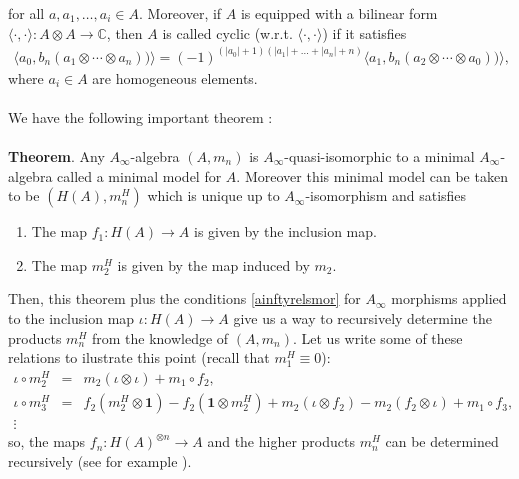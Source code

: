 \documentclass[a4paper,11pt]{article}
\numberwithin{equation}{section}
\begin{document}
for all $a,a_{1},\ldots, a_{i}\in A$. Moreover, if $A$ is equipped with a 
bilinear form $\langle 
\cdot,\cdot\rangle:A\otimes A\rightarrow \mathbb{C}$, then $A$ is called cyclic 
(w.r.t. $\langle 
\cdot,\cdot\rangle$) if it satisfies
\begin{eqnarray}
\langle a_{0},b_{n}(a_{1}\otimes\cdots \otimes 
a_{n}))\rangle=(-1)^{(|a_{0}|+1)(|a_{1}|+\ldots+|a_{n}|+n)}\langle 
a_{1},b_{n}(a_{2}\otimes\cdots \otimes 
a_{0}))\rangle,
\end{eqnarray}
where $a_{i}\in A$ are homogeneous elements.\\\\
We have the following important theorem 
\cite{kadeishvili1980homology,kontsevich2001homological}:
\\\\
\textbf{Theorem}. Any $A_{\infty}$-algebra $(A,m_{n})$ is 
$A_{\infty}$-quasi-isomorphic to a minimal $A_{\infty}$-algebra called a 
minimal model for $A$. Moreover this minimal model can be taken to be 
$(H(A),m^{H}_{n})$ which is unique up to $A_{\infty}$-isomorphism and satisfies 
\begin{enumerate}
 \item The map $f_{1}: H(A)\rightarrow A$ is given by the inclusion map.
 \item The map $m_{2}^{H}$ is given by the map induced by $m_{2}$.
\end{enumerate}
Then, this theorem plus the conditions \eqref{ainftyrelsmor} for $A_{\infty}$ 
morphisms applied to the inclusion map $\iota:H(A)\rightarrow A$ give us a way 
to recursively determine the products $m_{n}^{H}$ from the knowledge of 
$(A,m_{n})$. Let us write some of these relations to ilustrate this point 
(recall that $m^{H}_{1}\equiv 0$):
\begin{eqnarray}\label{relsinclusion}
\iota\circ m_{2}^{H} &=& m_{2}(\iota\otimes \iota)+m_{1}\circ f_{2},\nonumber\\
\iota\circ m_{3}^{H} &=& f_{2}(m^{H}_{2}\otimes \mathbf{1})-f_{2} 
(\mathbf{1}\otimes m^{H}_{2})+m_{2}(\iota\otimes f_{2})-m_{2}(f_{2}\otimes 
 \iota)+m_{1}\circ f_{3},\nonumber\\
\vdots  
\end{eqnarray}
so, the maps $f_{n}:H(A)^{\otimes n}\rightarrow A$ and the higher products 
$m^{H}_{n}$ can be determined 
recursively (see for example \cite{Aspinwall:2004bs}).
\end{document}

